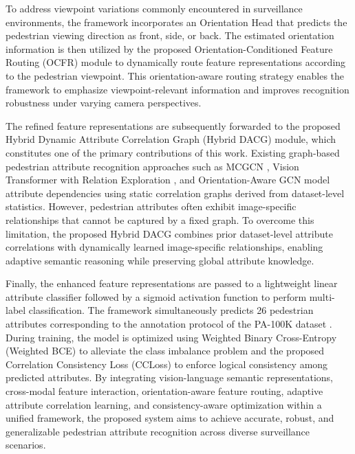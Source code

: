 \documentclass{ieeeaccess}
\begin{document}
To address viewpoint variations commonly encountered in surveillance environments, the framework incorporates an Orientation Head that predicts the pedestrian viewing direction as front, side, or back. The estimated orientation information is then utilized by the proposed Orientation-Conditioned Feature Routing (OCFR) module to dynamically route feature representations according to the pedestrian viewpoint. This orientation-aware routing strategy enables the framework to emphasize viewpoint-relevant information and improves recognition robustness under varying camera perspectives.

The refined feature representations are subsequently forwarded to the proposed Hybrid Dynamic Attribute Correlation Graph (Hybrid DACG) module, which constitutes one of the primary contributions of this work. Existing graph-based pedestrian attribute recognition approaches such as MCGCN \cite{bib3}, Vision Transformer with Relation Exploration \cite{bib4}, and Orientation-Aware GCN \cite{bib5} model attribute dependencies using static correlation graphs derived from dataset-level statistics. However, pedestrian attributes often exhibit image-specific relationships that cannot be captured by a fixed graph. To overcome this limitation, the proposed Hybrid DACG combines prior dataset-level attribute correlations with dynamically learned image-specific relationships, enabling adaptive semantic reasoning while preserving global attribute knowledge.

Finally, the enhanced feature representations are passed to a lightweight linear attribute classifier followed by a sigmoid activation function to perform multi-label classification. The framework simultaneously predicts 26 pedestrian attributes corresponding to the annotation protocol of the PA-100K dataset \cite{PA-100K}. During training, the model is optimized using Weighted Binary Cross-Entropy (Weighted BCE) to alleviate the class imbalance problem and the proposed Correlation Consistency Loss (CCLoss) to enforce logical consistency among predicted attributes. By integrating vision-language semantic representations, cross-modal feature interaction, orientation-aware feature routing, adaptive attribute correlation learning, and consistency-aware optimization within a unified framework, the proposed system aims to achieve accurate, robust, and generalizable pedestrian attribute recognition across diverse surveillance scenarios.
\end{document}
